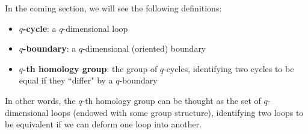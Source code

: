 In the coming section, we will see the following definitions:
\begin{itemize}
    \item \textbf{$q$-cycle}: a $q$-dimensional loop
    \item \textbf{$q$-boundary}: a $q$-dimensional (oriented) boundary
    \item \textbf{$q$-th homology group}: the group of $q$-cycles, identifying two cycles to be equal if they ``differ" by a $q$-boundary
\end{itemize}
In other words, the $q$-th homology group can be thought as the set of $q$-dimensional loops (endowed with some group structure), identifying two loops to be equivalent if we can deform one loop into another.